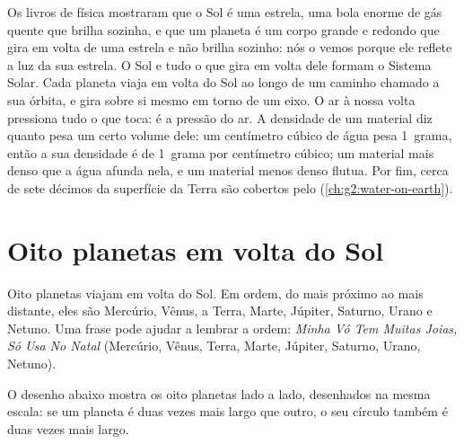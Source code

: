 \begin{recall}
Os livros de física mostraram que o Sol é uma estrela, uma bola enorme de
gás quente que brilha sozinha, e que um planeta é um corpo grande e
redondo que gira em volta de uma estrela e não brilha sozinho: nós o vemos
porque ele reflete a luz da sua estrela. O Sol e tudo o que gira em volta
dele formam o Sistema Solar. Cada planeta viaja em volta do Sol ao longo de
um caminho chamado a sua órbita, e gira sobre si mesmo em torno de um
eixo. O ar à nossa volta pressiona tudo o que toca: é a pressão do ar. A
densidade de um material diz quanto pesa um certo volume dele: um
centímetro cúbico de água pesa 1~grama, então a sua densidade é de 1~grama
por centímetro cúbico; um material mais denso que a água afunda nela, e um
material menos denso flutua. Por fim, cerca de sete décimos da superfície
da Terra são cobertos pelo  (\cref{ch:g2:water-on-earth}).
\end{recall}

\section{Oito planetas em volta do Sol}

Oito planetas viajam em volta do Sol. Em ordem, do mais próximo ao mais
distante, eles são Mercúrio, Vênus, a Terra, Marte, Júpiter, Saturno, Urano
e Netuno. Uma frase pode ajudar a lembrar a ordem: \emph{Minha Vó Tem
Muitas Joias, Só Usa No Natal} (Mercúrio, Vênus, Terra, Marte, Júpiter,
Saturno, Urano, Netuno).

O desenho abaixo mostra os oito planetas lado a lado, desenhados na mesma
escala: se um planeta é duas vezes mais largo que outro, o seu círculo
também é duas vezes mais largo.

